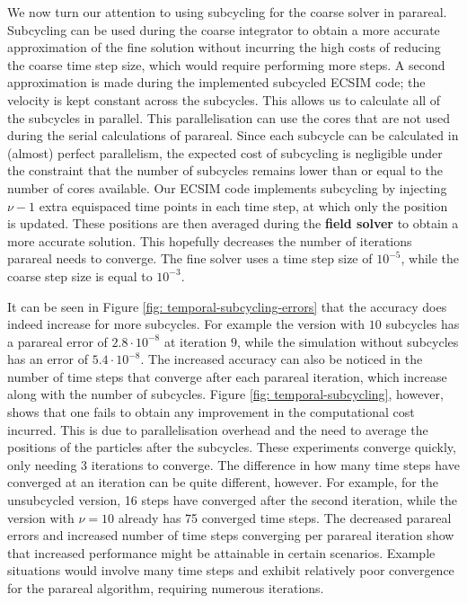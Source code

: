 We now turn our attention to using subcycling for the coarse solver in parareal. Subcycling can be used during the coarse integrator to obtain a more accurate approximation of the fine solution without incurring the high costs of reducing the coarse time step size, which would require performing more steps. A second approximation is made during the implemented subcycled ECSIM code; the velocity is kept constant across the subcycles\cite{lapenta_advances_2023}. This allows us to calculate all of the subcycles in parallel. This parallelisation can use the cores that are not used during the serial calculations of parareal. Since each subcycle can be calculated in (almost) perfect parallelism, the expected cost of subcycling is negligible under the constraint that the number of subcycles remains lower than or equal to the number of cores available. Our ECSIM code implements subcycling by injecting $\nu-1$ extra equispaced time points in each time step, at which only the position is updated. These positions are then averaged during the \textbf{field solver} to obtain a more accurate solution. This hopefully decreases the number of iterations parareal needs to converge. The fine solver uses a time step size of $10^{-5}$, while the coarse step size is equal to $10^{-3}$.

It can be seen in Figure \ref{fig: temporal-subcycling-errors} that the accuracy does indeed increase for more subcycles. For example the version with $10$ subcycles has a parareal error of $2.8\cdot 10^{-8}$ at iteration $9$, while the simulation without subcycles has an error of $5.4\cdot 10^{-8}$.  The increased accuracy can also be noticed in the number of time steps that converge after each parareal iteration, which increase along with the number of subcycles. Figure \ref{fig: temporal-subcycling}, however, shows that one fails to obtain any improvement in the computational cost incurred. This is due to parallelisation overhead and the need to average the positions of the particles after the subcycles. These experiments converge quickly, only needing $3$ iterations to converge. The difference in how many time steps have converged at an iteration can be quite different, however. For example, for the unsubcycled version, 16 steps have converged after the second iteration, while the version with $\nu = 10$ already has 75 converged time steps. The decreased parareal errors and increased number of time steps converging per parareal iteration show that increased performance might be attainable in certain scenarios. Example situations would involve many time steps and exhibit relatively poor convergence for the parareal algorithm, requiring numerous iterations.

